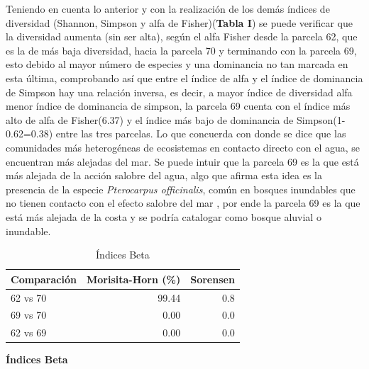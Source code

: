 \documentclass[conference,final,12pt,]{IEEEtran}
\begin{document}
Teniendo en cuenta lo anterior y con la realización de los demás índices
de diversidad (Shannon, Simpson y alfa de Fisher)(\textbf{Tabla I}) se
puede verificar que la diversidad aumenta (sin ser alta), según el alfa
Fisher desde la parcela 62, que es la de más baja diversidad, hacia la
parcela 70 y terminando con la parcela 69, esto debido al mayor número
de especies y una dominancia no tan marcada en esta última, comprobando
así que entre el índice de alfa y el índice de dominancia de Simpson hay
una relación inversa, es decir, a mayor índice de diversidad alfa menor
índice de dominancia de simpson, la parcela 69 cuenta con el índice más
alto de alfa de Fisher(6.37) y el índice más bajo de dominancia de
Simpson(1-0.62=0.38) entre las tres parcelas. Lo que concuerda 
con \citep{Z} donde se dice que las comunidades más heterogéneas
de ecosistemas en contacto directo con el agua, se encuentran más
alejadas del mar. Se puede intuir que la parcela 69 es la
que está más alejada de la acción salobre del agua, algo que afirma esta
idea es la presencia de la especie \emph{Pterocarpus officinalis}, común 
en bosques inundables que no tienen contacto con el
efecto salobre del mar \citep{Y}, por ende la parcela 69 es la
que está más alejada de la costa y se podría catalogar como bosque
aluvial o inundable.

\begin{table}[htb]

\caption{\label{tab:unnamed-chunk-3}Índices Beta}
\centering
\begin{tabular}[t]{l|r|r}
\hline
Comparación & Morisita-Horn (\%) & Sorensen\\
\hline
62 vs 70 & 99.44 & 0.8\\
\hline
69 vs 70 & 0.00 & 0.0\\
\hline
62 vs 69 & 0.00 & 0.0\\
\hline
\end{tabular}
\end{table}

\textbf{Índices Beta}
\end{document}
